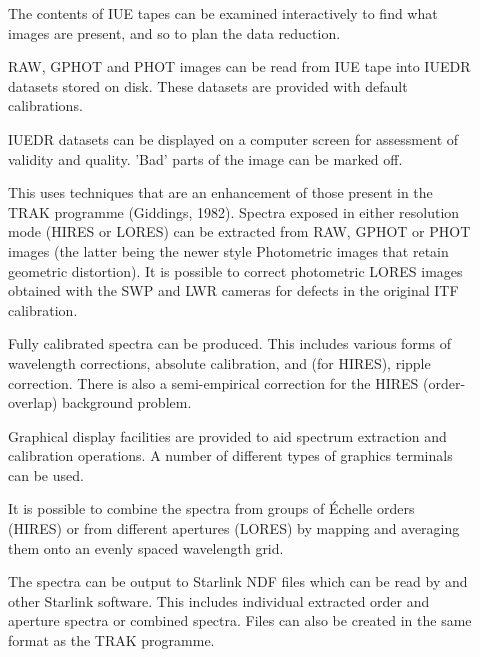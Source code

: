 \begin{description}

\item []
      The contents of IUE tapes can be examined interactively to find
      what images are present, and so to plan the data reduction.

\item []
      RAW, GPHOT and PHOT images can be read from IUE tape into IUEDR
      datasets stored on disk.  These datasets are provided with default
      calibrations.

\item []
      IUEDR datasets can be displayed on a computer screen for
      assessment of validity and quality.  'Bad' parts of the image can
      be marked off.

\item []
      This uses techniques that are an enhancement of those present in
      the TRAK programme (Giddings, 1982)\@.  Spectra exposed in either
      resolution mode (HIRES or LORES) can be extracted from RAW, GPHOT
      or PHOT images (the latter being the newer style Photometric
      images that retain geometric distortion)\@.  It is possible to
      correct photometric LORES images obtained with the SWP and LWR
      cameras for defects in the original ITF calibration.

\item []
      Fully calibrated spectra can be produced.  This includes various
      forms of wavelength corrections, absolute calibration, and (for
      HIRES), ripple correction.  There is also a semi-empirical
      correction for the HIRES (order-overlap) background problem.

\item []
      Graphical display facilities are provided to aid spectrum
      extraction and calibration operations.  A number of different
      types of graphics terminals can be used.

\item []
      It is possible to combine the spectra from groups of \'{E}chelle
      orders (HIRES) or from different apertures (LORES) by mapping and
      averaging them onto an evenly spaced wavelength grid.

\item []
      The spectra can be output to Starlink NDF files which can be read
      by  and other Starlink software.   This
      includes individual extracted order and aperture spectra or
      combined spectra. Files can also be created in the same format as
      the TRAK programme.

\end{description}

